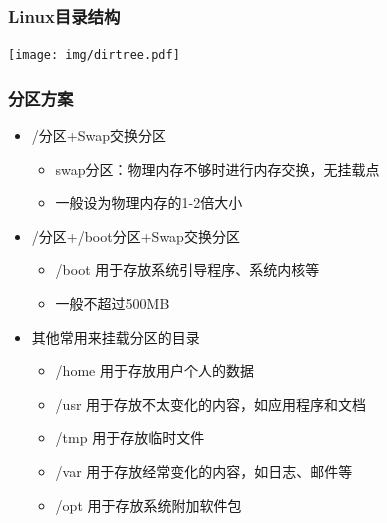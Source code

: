 \documentclass[xcolor=svgnames,presentation]{beamer}
\begin{document}
\begin{frame}
\frametitle{Linux目录结构}
\label{sec-3-2-2}

\texttt{[image: img/dirtree.pdf]}
\end{frame}
\begin{frame}
\frametitle{分区方案}
\label{sec-3-2-3}
\begin{itemize}

\item /分区+Swap交换分区
\label{sec-3-2-3-1}%
\begin{itemize}

\item swap分区：物理内存不够时进行内存交换，无挂载点
\label{sec-3-2-3-1-1}%

\item 一般设为物理内存的1-2倍大小
\label{sec-3-2-3-1-2}%
\end{itemize} %

\item /分区+/boot分区+Swap交换分区
\label{sec-3-2-3-2}%
\begin{itemize}

\item /boot 用于存放系统引导程序、系统内核等
\label{sec-3-2-3-2-1}%

\item 一般不超过500MB
\label{sec-3-2-3-2-2}%
\end{itemize} %

\item 其他常用来挂载分区的目录
\label{sec-3-2-3-3}%
\begin{itemize}

\item /home 用于存放用户个人的数据
\label{sec-3-2-3-3-1}%

\item /usr 用于存放不太变化的内容，如应用程序和文档
\label{sec-3-2-3-3-2}%

\item /tmp 用于存放临时文件
\label{sec-3-2-3-3-3}%

\item /var 用于存放经常变化的内容，如日志、邮件等
\label{sec-3-2-3-3-4}%

\item /opt 用于存放系统附加软件包
\label{sec-3-2-3-3-5}%
\end{itemize} %
\end{itemize} %
\end{frame}
\end{document}
